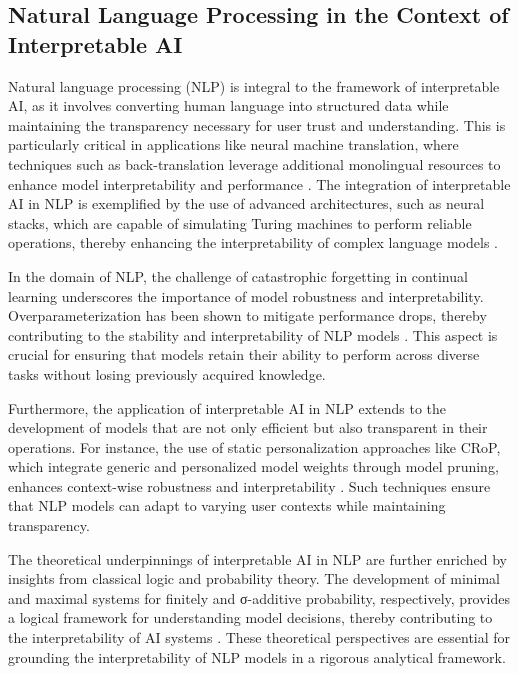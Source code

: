 \subsection{Natural Language Processing in the Context of Interpretable AI} \label{subsec:Natural Language Processing in the Context of Interpretable AI}



Natural language processing (NLP) is integral to the framework of interpretable AI, as it involves converting human language into structured data while maintaining the transparency necessary for user trust and understanding. This is particularly critical in applications like neural machine translation, where techniques such as back-translation leverage additional monolingual resources to enhance model interpretability and performance \cite{bogoychev2020domaintranslationesenoisesynthetic}. The integration of interpretable AI in NLP is exemplified by the use of advanced architectures, such as neural stacks, which are capable of simulating Turing machines to perform reliable operations, thereby enhancing the interpretability of complex language models \cite{stogin2022provablystableneuralnetwork}.



In the domain of NLP, the challenge of catastrophic forgetting in continual learning underscores the importance of model robustness and interpretability. Overparameterization has been shown to mitigate performance drops, thereby contributing to the stability and interpretability of NLP models \cite{goldfarb2022analysiscatastrophicforgettingrandom}. This aspect is crucial for ensuring that models retain their ability to perform across diverse tasks without losing previously acquired knowledge.



Furthermore, the application of interpretable AI in NLP extends to the development of models that are not only efficient but also transparent in their operations. For instance, the use of static personalization approaches like CRoP, which integrate generic and personalized model weights through model pruning, enhances context-wise robustness and interpretability \cite{kaur2024cropcontextwiserobuststatic}. Such techniques ensure that NLP models can adapt to varying user contexts while maintaining transparency.



The theoretical underpinnings of interpretable AI in NLP are further enriched by insights from classical logic and probability theory. The development of minimal and maximal systems for finitely and σ-additive probability, respectively, provides a logical framework for understanding model decisions, thereby contributing to the interpretability of AI systems \cite{cieslinski2022axiomstypefreesubjectiveprobability}. These theoretical perspectives are essential for grounding the interpretability of NLP models in a rigorous analytical framework.




